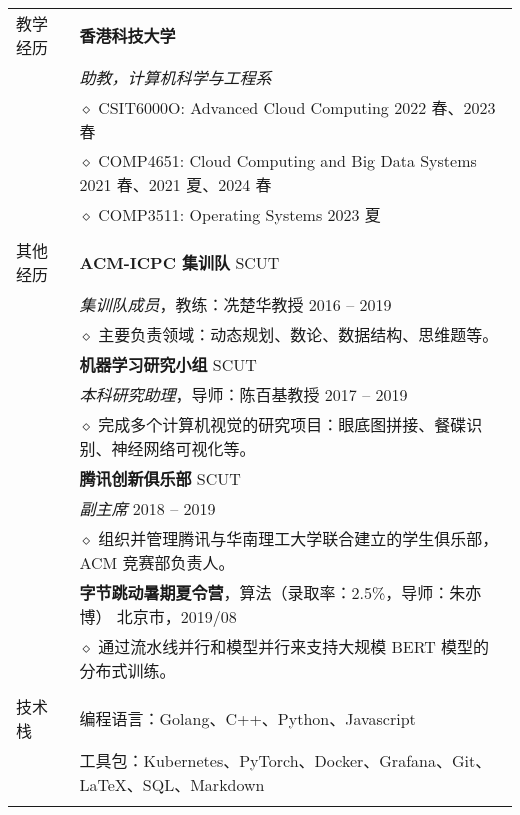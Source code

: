 \documentclass[letterpaper, 10pt]{article}
\begin{document}
\begin{longtable}{p{0.7in}p{6.0in}}
{教学经历}
& \textbf{香港科技大学} \\
& \textit{助教，计算机科学与工程系} \\
& $\diamond$ CSIT6000O: Advanced Cloud Computing \hfill 2022 春、2023 春\\
& $\diamond$ COMP4651: Cloud Computing and Big Data Systems \hfill 2021 春、2021 夏、2024 春\\
& $\diamond$ COMP3511: Operating Systems \hfill 2023 夏 \\
& \\

{其他经历}
& \textbf{ACM-ICPC 集训队} \hfill SCUT \\
& \textit{集训队成员}，教练：冼楚华教授 \hfill 2016 -- 2019 \\
& $\diamond$ 主要负责领域：动态规划、数论、数据结构、思维题等。 \\

& \textbf{机器学习研究小组} \hfill SCUT \\
& \textit{本科研究助理}，导师：陈百基教授 \hfill 2017 -- 2019 \\
& $\diamond$ 完成多个计算机视觉的研究项目：眼底图拼接、餐碟识别、神经网络可视化等。\\

& \textbf{腾讯创新俱乐部} \hfill SCUT \\
& \textit{副主席} \hfill 2018 -- 2019 \\
& $\diamond$ 组织并管理腾讯与华南理工大学联合建立的学生俱乐部，ACM 竞赛部负责人。 \\

& \textbf{字节跳动暑期夏令营}，算法（录取率：2.5\%，导师：朱亦博） \hfill 北京市，2019/08\\
& $\diamond$ 通过流水线并行和模型并行来支持大规模 BERT 模型的分布式训练。\\

& \\

\nohyphens{技术栈}
& 编程语言：Golang、C++、Python、Javascript \\
& 工具包：Kubernetes、PyTorch、Docker、Grafana、Git、\LaTeX、SQL、Markdown \\
& \\


\end{longtable}
\end{document}
